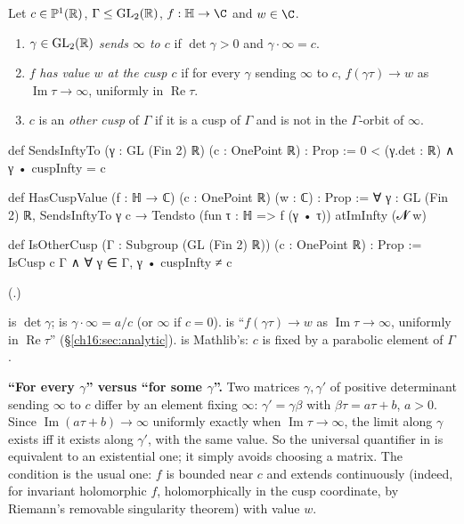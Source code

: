 \begin{definition}\label{ch16:def:cuspdata}
Let $c\in\mathbb{P}^1(\mathbb{R})$, $\Gamma\le\mathrm{GL}_2(\mathbb{R})$, $f:\chsixteenH\to\C$ and $w\in\C$.
\begin{enumerate}[label=(\alph*)]
\item $\gamma\in\mathrm{GL}_2(\mathbb{R})$ \emph{sends $\infty$ to $c$} if $\det\gamma>0$ and $\gamma\cdot\infty=c$.
\item $f$ \emph{has value $w$ at the cusp $c$} if for every $\gamma$ sending $\infty$ to $c$,
  $f(\gamma\tau)\to w$ as $\operatorname{Im}\tau\to\infty$, uniformly in $\operatorname{Re}\tau$.
\item $c$ is an \emph{other cusp} of $\Gamma$ if it is a cusp of $\Gamma$ and is not in the $\Gamma$-orbit of $\infty$.
\end{enumerate}
\end{definition}
\begin{leancode}
def SendsInftyTo (γ : GL (Fin 2) ℝ) (c : OnePoint ℝ) : Prop :=
  0 < (γ.det : ℝ) ∧ γ • cuspInfty = c

def HasCuspValue (f : ℍ → ℂ) (c : OnePoint ℝ) (w : ℂ) : Prop :=
  ∀ γ : GL (Fin 2) ℝ, SendsInftyTo γ c → Tendsto (fun τ : ℍ => f (γ • τ)) atImInfty (𝓝 w)

def IsOtherCusp (Γ : Subgroup (GL (Fin 2) ℝ)) (c : OnePoint ℝ) : Prop :=
  IsCusp c Γ ∧ ∀ γ ∈ Γ, γ • cuspInfty ≠ c
\end{leancode}
(.)
\begin{dictionary}
 is $\det\gamma$;  is $\gamma\cdot\infty=a/c$ (or $\infty$ if $c=0$).
 is ``$f(\gamma\tau)\to w$ as $\operatorname{Im}\tau\to\infty$,
uniformly in $\operatorname{Re}\tau$'' (\S\ref{ch16:sec:analytic}).   is Mathlib's: $c$ is fixed by a
parabolic element of $\Gamma$.

\textbf{``For every $\gamma$'' versus ``for some $\gamma$''.}  Two matrices $\gamma,\gamma'$ of positive determinant
sending $\infty$ to $c$ differ by an element fixing $\infty$: $\gamma'=\gamma\beta$ with
$\beta\tau=a\tau+b$, $a>0$.  Since $\operatorname{Im}(a\tau+b)\to\infty$ uniformly exactly when
$\operatorname{Im}\tau\to\infty$, the limit along $\gamma$ exists iff it exists along $\gamma'$, with the same value.
So the universal quantifier in  is equivalent to an existential one; it simply avoids choosing a
matrix.  The condition is the usual one: $f$ is bounded near $c$ and extends continuously (indeed, for invariant
holomorphic $f$, holomorphically in the cusp coordinate, by Riemann's removable singularity theorem) with value $w$.
\end{dictionary}
